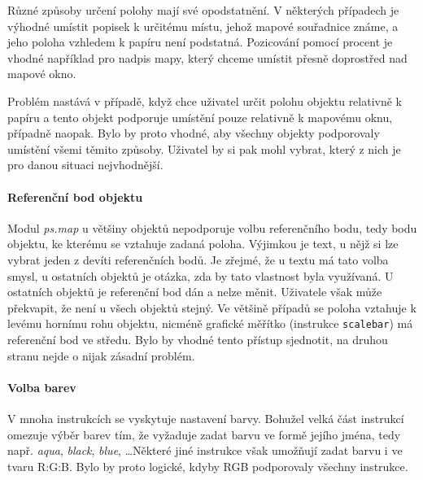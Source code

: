 \documentclass[a4paper,12pt,draft]{article}
\newcommand{\modul}[1]{\emph{#1}}
\newcommand{\instr}[1]{\lstinline[style=psmapInline]{#1}}
\begin{document}
Různé způsoby určení polohy mají své opodstatnění. V některých případech je výhodné umístit popisek k určitému místu, jehož mapové souřadnice známe, a jeho poloha vzhledem k papíru není podstatná. Pozicování pomocí procent je vhodné například pro nadpis mapy, který chceme umístit přesně doprostřed nad mapové okno. 

Problém nastává v případě, když chce uživatel určit polohu objektu relativně k papíru a tento objekt podporuje umístění pouze relativně k mapovému oknu, případně naopak. Bylo by proto vhodné, aby všechny objekty podporovaly umístění všemi těmito způsoby. Uživatel by si pak mohl vybrat, který z nich je pro danou situaci nejvhodnější.

\paragraph*{Referenční bod objektu}
\label{sec:psmap:referencepoint}
Modul \modul{ps.map} u většiny objektů nepodporuje volbu referenčního bodu, tedy bodu objektu, ke kterému se vztahuje zadaná poloha. Výjimkou je text, u nějž si lze vybrat jeden z devíti referenčních bodů. Je zřejmé, že u textu má tato volba smysl, u ostatních objektů je otázka, zda by tato vlastnost byla využívaná. 
U ostatních objektů je referenční bod dán a nelze měnit. Uživatele však může překvapit, že není u všech objektů stejný. Ve většině případů se poloha vztahuje k levému hornímu rohu objektu, nicméně grafické měřítko (instrukce \instr{scalebar}) má referenční bod ve středu. Bylo by vhodné tento přístup sjednotit, na druhou stranu nejde o nijak zásadní problém. 

\paragraph*{Volba barev}
\label{sec:psmap:color}
V mnoha instrukcích se vyskytuje nastavení barvy. Bohužel velká část instrukcí omezuje výběr barev tím, že vyžaduje zadat barvu ve formě jejího jména, tedy např. \emph{aqua}, \emph{black}, \emph{blue}, \ldots Některé jiné instrukce však umožňují zadat barvu i ve tvaru R:G:B. Bylo by proto logické, kdyby RGB podporovaly všechny instrukce.
\end{document}
